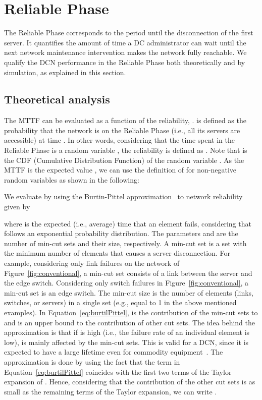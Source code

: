 \section{Reliable Phase}
\label{sec:reliableTime} 

The Reliable Phase corresponds to the period until the disconnection of the first server. It quantifies the amount of time a DC administrator can wait until the next network maintenance intervention makes the network fully reachable. We qualify the DCN performance in the Reliable Phase both theoretically and by simulation, as explained in this section.

\subsection{Theoretical analysis}

The MTTF can be evaluated as a function of the reliability, .  is defined as the probability that the network is on the Reliable Phase (i.e., all its servers are accessible) at time . In other words, considering that the time spent in the Reliable Phase is a random variable , the reliability is defined as . Note that  is the CDF (Cumulative Distribution Function) of the random variable . As the MTTF is the expected value , we can use the definition of  for non-negative random variables as shown in the following:


We evaluate  by using the Burtin-Pittel approximation~\cite{gertzbakh2009models} to network reliability given by

where  is the expected (i.e., average) time that an element fails, considering that  follows an exponential probability distribution. The parameters  and  are the number of min-cut sets and their size, respectively. A min-cut set is a set with the minimum number of elements that causes a server disconnection. For example, considering only link failures on the network of Figure~\ref{fig:conventional}, a min-cut set consists of a link between the server and the edge switch. Considering only switch failures in Figure~\ref{fig:conventional}, a min-cut set is an edge switch. 
The min-cut size is the number of elements (links, switches, or servers) in a single set (e.g., equal to 1 in the above mentioned examples). In Equation~\ref{eq:burtilPittel},  is the contribution of the min-cut sets to  and  is an upper bound to the contribution of other cut sets. The idea behind the approximation is that if  is high (i.e., the failure rate of an individual element is low),  is mainly affected by the min-cut sets. This is valid for a DCN, since it is expected to have a large lifetime even for commodity equipment~\cite{gill2011understanding}.
The approximation is done by using the fact that the term  in Equation~\ref{eq:burtilPittel} coincides with the first two terms of the Taylor expansion of . Hence, considering that the contribution of the other cut sets is as small as the remaining terms of the Taylor expansion, we can write . 

